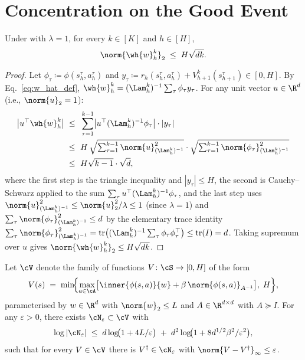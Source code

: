 \section{Concentration on the Good Event}\label{sec:concentration}

\begin{lemma}\label{lem:weight_bound}
Under  with $\lambda = 1$, for every $k \in [K]$ and $h \in [H]$,
\begin{align*}
\norm{\wh{w}_h^k}_2 \;\le\; H \sqrt{d k}.
\end{align*}
\end{lemma}

\begin{proof}
Let $\phi_\tau \coloneqq \phi(s_h^\tau, a_h^\tau)$ and $y_\tau \coloneqq r_h(s_h^\tau, a_h^\tau) + V_{h+1}^k(s_{h+1}^\tau) \in [0, H]$. By Eq.~\eqref{eq:w_hat_def}, $\wh{w}_h^k = (\Lam_h^k)^{-1} \sum_\tau \phi_\tau y_\tau$. For any unit vector $u \in \R^d$ (i.e., $\norm{u}_2 = 1$):
\begin{align*}
\bigl| u^\top \wh{w}_h^k \bigr|
\;\le\; & ~ \sum_{\tau=1}^{k-1} \bigl| u^\top (\Lam_h^k)^{-1} \phi_\tau \bigr| \cdot |y_\tau| \\
\;\le\; & ~ H \, \sqrt{\textstyle\sum_{\tau=1}^{k-1} \norm{u}_{(\Lam_h^k)^{-1}}^2} \cdot \sqrt{\textstyle\sum_{\tau=1}^{k-1} \norm{\phi_\tau}_{(\Lam_h^k)^{-1}}^2} \\
\;\le\; & ~ H \sqrt{k-1} \cdot \sqrt{d},
\end{align*}
where the first step is the triangle inequality and $|y_\tau| \le H$, the second is Cauchy--Schwarz applied to the sum $\sum_\tau u^\top (\Lam_h^k)^{-1} \phi_\tau$, and the last step uses $\norm{u}_{(\Lam_h^k)^{-1}}^2 \le \norm{u}_2^2 / \lambda \le 1$ (since $\lambda = 1$) and $\sum_\tau \norm{\phi_\tau}_{(\Lam_h^k)^{-1}}^2 \le d$ by the elementary trace identity $\sum_\tau \norm{\phi_\tau}_{(\Lam_h^k)^{-1}}^2 = \mathrm{tr}\bigl( (\Lam_h^k)^{-1} \sum_\tau \phi_\tau \phi_\tau^\top \bigr) \le \mathrm{tr}(I) = d$. Taking supremum over $u$ gives $\norm{\wh{w}_h^k}_2 \le H \sqrt{d k}$.
\end{proof}

\begin{lemma}\label{lem:cover}
Let $\cV$ denote the family of functions $V \colon \cS \to [0, H]$ of the form
\begin{align*}
V(s) \;=\; \min\!\Bigl\{ \max_{a \in \cA} \bigl[ \inner{\phi(s, a)}{w} + \beta\, \norm{\phi(s, a)}_{A^{-1}} \bigr],\; H \Bigr\},
\end{align*}
parameterised by $w \in \R^d$ with $\norm{w}_2 \le L$ and $A \in \R^{d \times d}$ with $A \succeq I$. For any $\varepsilon > 0$, there exists $\cN_\varepsilon \subset \cV$ with
\begin{align*}
\log |\cN_\varepsilon|
\;\le\; d \log\!\bigl(1 + 4 L / \varepsilon\bigr) \;+\; d^2 \log\!\bigl(1 + 8 d^{1/2} \beta^2 / \varepsilon^2\bigr),
\end{align*}
such that for every $V \in \cV$ there is $V^\dagger \in \cN_\varepsilon$ with $\norm{V - V^\dagger}_\infty \le \varepsilon$.
\end{lemma}


